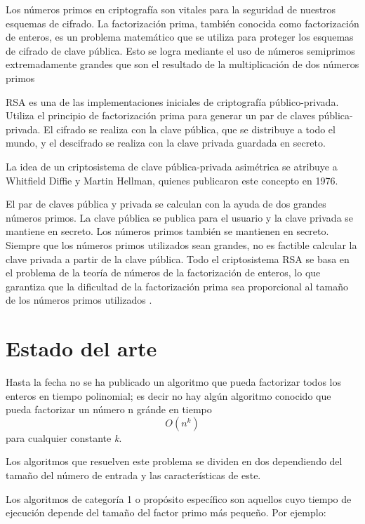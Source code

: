 \documentclass{article}
\begin{document}
Los números primos en criptografía son vitales para la seguridad de nuestros
esquemas de cifrado. La factorización prima, también conocida como factorización
de enteros, es un problema matemático que se utiliza para proteger los esquemas
de cifrado de clave pública. Esto se logra mediante el uso de números semiprimos
extremadamente grandes que son el resultado de la multiplicación de dos números
primos \cite{sedgewick2015introduction}

RSA es una de las implementaciones iniciales de criptografía público-privada.
Utiliza el principio de factorización prima para generar un par de claves
pública-privada. El cifrado se realiza con la clave pública, que se distribuye a
todo el mundo, y el descifrado se realiza con la clave privada guardada en
secreto.

La idea de un criptosistema de clave pública-privada asimétrica se atribuye a
Whitfield Diffie y Martin Hellman, quienes publicaron este concepto en 1976.

El par de claves pública y privada se calculan con la ayuda de dos grandes
números primos. La clave pública se publica para el usuario y la clave privada
se mantiene en secreto. Los números primos también se mantienen en secreto.
Siempre que los números primos utilizados sean grandes, no es factible calcular
la clave privada a partir de la clave pública. Todo el criptosistema RSA se basa
en el problema de la teoría de números de la factorización de enteros, lo que
garantiza que la dificultad de la factorización prima sea proporcional al tamaño
de los números primos utilizados \cite{raj2019foundations}.


\section{Estado del arte}

Hasta la fecha no se ha publicado un algoritmo que pueda factorizar todos los
enteros en tiempo polinomial; es decir no hay algún algoritmo conocido que pueda
factorizar un número n gránde en tiempo $$ O(n^k)$$ para cualquier constante
\textit{k}.

Los algoritmos que resuelven este problema se dividen en dos dependiendo del
tamaño del número de entrada y las características de este.

Los algoritmos de categoría 1 o propósito específico son aquellos cuyo tiempo de
ejecución depende del tamaño del factor primo más pequeño. Por ejemplo:
\end{document}
